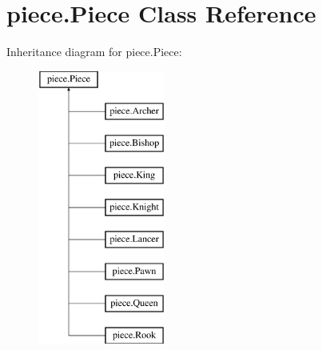 \hypertarget{classpiece_1_1_piece}{}\section{piece.\+Piece Class Reference}
\label{classpiece_1_1_piece}
Inheritance diagram for piece.\+Piece\+:\begin{figure}[H]
\begin{center}
\leavevmode
\includegraphics[height=9.000000cm]{classpiece_1_1_piece}
\end{center}
\end{figure}
